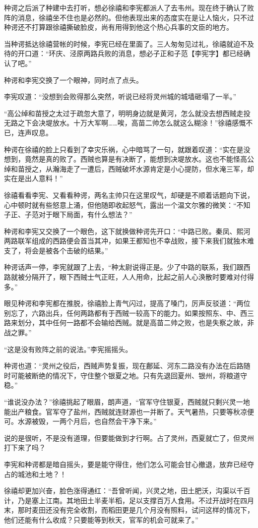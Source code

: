 种谔之后派了种建中去打听，想必徐禧和李宪都派人了去韦州。现在终于确认了败阵的消息，徐禧坐不住也是必然的。但他表现出来的态度实在是让人恼火，只不过种谔还不打算跟徐禧撕破脸皮，尚有用得到他这个热心兵事的文臣的地方。

当种谔抵达徐禧营帐的时候，李宪已经在里面了。三人匆匆见过礼，徐禧就迫不及待的开口道：“环庆、泾原两路兵败的消息，想必子正和子范【李宪字】都已经确认了吧。”

种谔和李宪交换了一个眼神，同时点了点头。

李宪叹道：“没想到会败得那么突然，听说已经将灵州城的城墙砸塌了一半。”

“高公绰和苗授之太过于疏忽大意了，明明身边就是黄河，怎么就没去想西贼走投无路之下会决堤放水。十万大军啊……唉，高苗二帅怎么就这么糊涂！”徐禧感慨不已，连声叹息。

种谔在徐禧的脸上只看到了幸灾乐祸，心中暗骂了一句，就跟着叹道：“实在是没想到，竟然是真的败了。西贼也算是有决断了，能想到决堤放水。这也不能怪高公绰和苗授之，从瀚海走了一遭后，西贼破坏水源肯定是小心提防，但水淹三军，却实在是出人意料！”

徐禧看看李宪、又看看种谔，两名主帅只在这里叹气，却硬是不顺着话题向下说，心中顿时就有些怒意上涌，但他随即收起怒气，露出一个温文尔雅的微笑：“不知子正、子范对于眼下局面，有什么想法？”

种谔和李宪又交换了一个眼色，这下就换做种谔先开口：“中路已败。秦凤、熙河两路联军组成的西路便会首当其冲，如果王都知也不幸战败，接下来我们就独木难支了，将会是被各个击破的结果。”

种谔话声一停，李宪就跟了上去，“种太尉说得正是。少了中路的联系，我们跟西路就被分隔开了，眼下西贼士气正旺，人人用命，比起之前人心涣散时要难对付得多。”

眼见种谔和李宪都在推脱，徐禧脸上青气闪过，提高了嗓门，厉声反驳道：“两位别忘了，六路出兵，任何两路都有于西贼一较高下的能力。如果按照东、中、西三路来划分，其中任何一路都不会输给西贼。就是高苗二帅之败，也是失察之故，非战之罪。”

“这是没有败阵之前的说法。”李宪摇摇头。

种谔也道：“灵州之役后，西贼声势复振，现在鄜延、河东二路没有办法在后路随时可能被断绝的情况下，守住整个银夏之地。只有先退回夏州、银州，将粮道守稳。”

“谁说没办法？”徐禧挑起了眼眉，朗声道，“官军守住银夏，西贼就只剩兴灵一地能出产粮食。官军夺了盐州，西贼就连财源也一并断了。天气暑热，只要等秋凉便可。水源被毁，一两个月后，也自然会干净下来。”

说的是很听，不是没有道理，但要能做到才行啊。占了灵州，西夏就亡了，但灵州打下来了吗？

李宪和种谔都是暗自摇头，要是能守得住，他们怎么可能会甘心撤退，放弃已经夺占的城池和土地？！

徐禧却更加兴奋，脸色涨得通红：“吾曾听闻，兴灵之地，田土肥沃，沟渠以千百计，乃是塞上江南。其地田土半麦半稻，足以支撑百万人食用。不过开战时在四月末，那时麦田还没有完全收割，而稻田更是几个月没有照料，试问这样的情况下，他们还能有什么收成？只要能等到秋天，官军的机会可就来了。”

